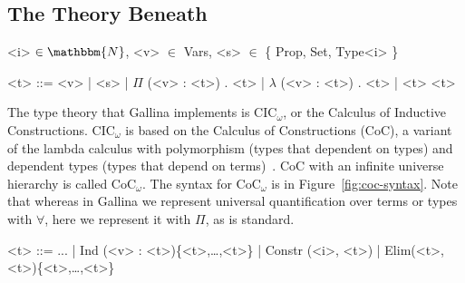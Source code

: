 \subsection{The Theory Beneath}
\label{sec:mot-theory}

\begin{figure*}
\small
\begin{grammar}
<i> $\in \mathbbm{N}$, <v> $\in$ Vars, <s> $\in$ \{ Prop, Set, Type<i> \}

<t> ::= <v> \hspace{0.06cm} | \hspace{0.06cm} <s> \hspace{0.06cm} | \hspace{0.06cm} $\Pi$ (<v> : <t>) . <t> \hspace{0.06cm} | \hspace{0.06cm} $\lambda$ (<v> : <t>) . <t> \hspace{0.06cm} | \hspace{0.06cm} <t> <t>
\end{grammar}
\vspace{-0.3cm}
\caption{Syntax for CoC$_\omega$ with (from left to right) variables, sorts, dependent types, functions, and application.}
\label{fig:coc-syntax}
\end{figure*}

The type theory that Gallina implements is CIC$_{\omega}$, or the Calculus of Inductive Constructions.
CIC$_{\omega}$ is based on the Calculus of Constructions (CoC), a variant of the lambda calculus with polymorphism (types that dependent on types) and dependent types (types that depend on terms)~\cite{coquand:inria-00076024}.
CoC with an infinite universe hierarchy is called CoC$_{\omega}$. %
The syntax for CoC$_{\omega}$ is in Figure~\ref{fig:coc-syntax}.
Note that whereas in Gallina we represent universal quantification over terms or types with $\forall$, here we represent it with $\Pi$, as is standard.

\begin{figure*}
\small
\begin{grammar}
<t> ::= ... | \hspace{0.06cm} Ind (<v> : <t>)\{<t>,\ldots,<t>\} \hspace{0.06cm} | \hspace{0.06cm} Constr (<i>, <t>) \hspace{0.06cm} | \hspace{0.06cm} Elim(<t>, <t>)\{<t>,\ldots,<t>\}
\end{grammar}
\vspace{-0.3cm}
\caption{CIC$_\omega$ is CoC$_\omega$ with inductive types, inductive constructors, and .}
\label{fig:cic-syntax}
\end{figure*}

